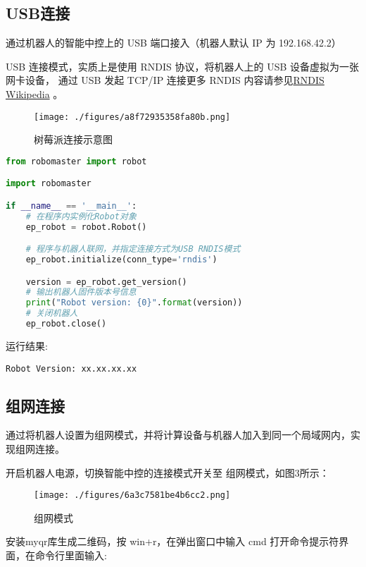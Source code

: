 \subsection{USB连接}\label{sub_PyRM2_2}

通过机器人的智能中控上的 USB 端口接入（机器人默认 IP 为 192.168.42.2）

USB 连接模式，实质上是使用 RNDIS 协议，将机器人上的 USB 设备虚拟为一张网卡设备， 通过 USB 发起 TCP/IP 连接更多 RNDIS 内容请参见\href{https://www.wikipedia.org/wiki/RNDIS}{RNDIS Wikipedia} 。

\begin{figure}[ht]
\centering
\texttt{[image: ./figures/a8f72935358fa80b.png]}
\caption{树莓派连接示意图} \label{fig_PyRM2_2}
\end{figure}

\begin{lstlisting}[language=python]
from robomaster import robot

import robomaster

if __name__ == '__main__':
    # 在程序内实例化Robot对象
    ep_robot = robot.Robot()

    # 程序与机器人联网，并指定连接方式为USB RNDIS模式
    ep_robot.initialize(conn_type='rndis')

    version = ep_robot.get_version()
    # 输出机器人固件版本号信息
    print("Robot version: {0}".format(version))
    # 关闭机器人
    ep_robot.close()
\end{lstlisting}

运行结果:
\begin{lstlisting}[language=pythonC]
Robot Version: xx.xx.xx.xx
\end{lstlisting}

\subsection{组网连接}\label{sub_PyRM2_3}

通过将机器人设置为组网模式，并将计算设备与机器人加入到同一个局域网内，实现组网连接。

开启机器人电源，切换智能中控的连接模式开关至 组网模式，如图3所示：

\begin{figure}[ht]
\centering
\texttt{[image: ./figures/6a3c7581be4b6cc2.png]}
\caption{组网模式} \label{fig_PyRM2_3}
\end{figure}

安装myqr库生成二维码，按 win+r，在弹出窗口中输入 cmd 打开命令提示符界面，在命令行里面输入:

